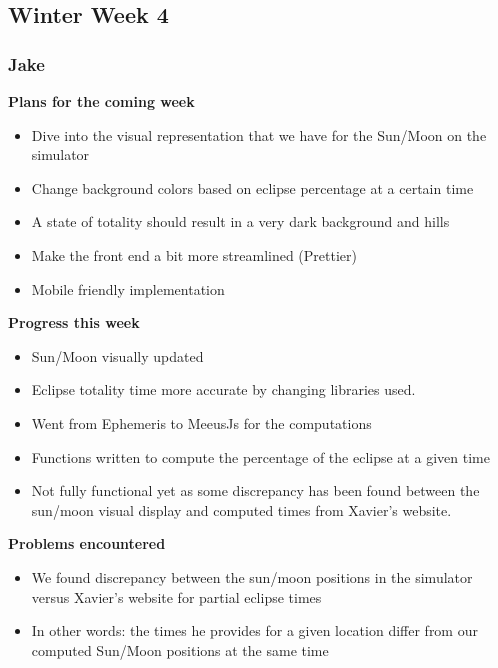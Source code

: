 \documentclass[10pt, onecolumn, draftclsnofoot, letterpaper, compsoc]{IEEEtran}
\begin{document}
\subsection{Winter Week 4}

    \subsubsection{Jake}

    \noindent \textbf{Plans for the coming week}

    \begin{itemize}

    \item Dive into the visual representation that we have for the Sun/Moon on the simulator
    \item Change background colors based on eclipse percentage at a certain time
      \item A state of totality should result in a very dark background and hills
    \item Make the front end a bit more streamlined (Prettier)
    \item Mobile friendly implementation

    \end{itemize}

    \noindent \textbf{Progress this week}

    \begin{itemize}

    \item Sun/Moon visually updated
    \item Eclipse totality time more accurate by changing libraries used.
    \item Went from Ephemeris to MeeusJs for the computations
    \item Functions written to compute the percentage of the eclipse at a given time
    \item Not fully functional yet as some discrepancy has been found between the sun/moon visual display and computed times from Xavier's website.

    \end{itemize}

    \noindent \textbf{Problems encountered}

    \begin{itemize}

    \item We found discrepancy between the sun/moon positions in the simulator versus Xavier's website for partial eclipse times
    \item In other words: the times he provides for a given location differ from our computed Sun/Moon positions at the same time

    \end{itemize}
\end{document}
